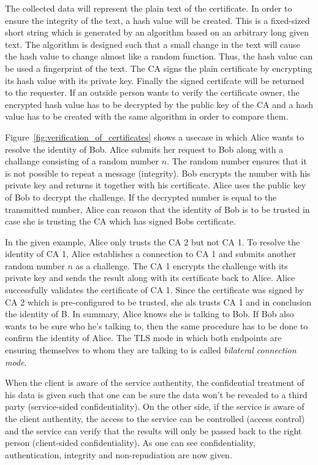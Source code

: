 The collected data will represent the plain text of the certificate.
In order to ensure the integrity of the text, a hash value will be created.
This is a fixed-sized short string which is generated by an algorithm based on an arbitrary long given text.
The algorithm is designed such that a small change in the text will cause the hash value to change almost like a random function.
Thus, the hash value can be used a fingerprint of the text.
The CA signs the plain certificate by encrypting its hash value with its private key.
Finally the signed certifcate will be returned to the requester.
If an outside person wants to verify the certificate owner, the encrypted hash value has to be decrypted by the public key of the CA and a hash value has to be created with the same algorithm in order to compare them.


Figure~\ref{fig:verification_of_certificates} shows a usecase in which Alice wants to resolve the identity of Bob.
Alice submits her request to Bob along with a challange consisting of a random number $n$. 
The random number ensures that it is not possible to repeat a message (integrity).
Bob encrypts the number with his private key and returns it together with his certificate.
Alice uses the public key of Bob to decrypt the challenge. 
If the decrypted number is equal to the transmitted number, Alice can reason that the identity of Bob is to be trusted in case she is trusting the CA which has signed Bobs certificate. 

In the given example, Alice only trusts the CA 2 but not CA 1.
To resolve the identity of CA 1, Alice establishes a connection to CA 1 and submits another random number $n$ as a challenge.
The CA 1 encrypts the challenge with its private key and sends the result along with its certificate back to Alice.
Alice successfully validates the certificate of CA 1.
Since the certificate was signed by CA 2 which is pre-configured to be trusted, she als trusts CA 1 and in conclusion the identity of B.
In summary, Alice knows she is talking to Bob.
If Bob also wants to be sure who he's talking to, then the same procedure has to be done to confirm the identity of Alice.
The TLS mode in which both endpoints are ensuring themselves to whom they are talking to is called \textit{bilateral connection mode}.


When the client is aware of the service authentity, the confidential treatment of his data is given such that one can be sure the data won't be revealed to a third party (service-sided confidentiality). 
On the other side, if the service is aware of the client authentity, the access to the service can be controlled (access control) and the service can verify that the results will only be passed back to the right person (client-sided confidentiality). 
As one can see confidentiality, authentication, integrity and non-repudiation are now given.

